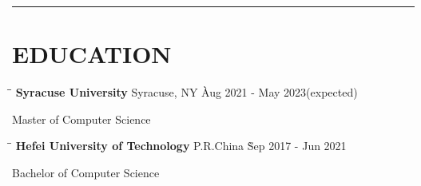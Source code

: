 \documentclass{res}
\begin{document}
 


\address{
    (315)-965-6606 $|$
    Syracuse, NY $|$
    \href{mailto:wangtzuhsiang@gmail.com}{wangtzuhsiang@gmail.com} $|$ 
    \href{https://www.linkedin.com/in/zixiangwang/}{LinkedIn} $|$ 
    \href{https://github.com/DolorHunter}{GitHub} $|$ 
    \href{https://dolorhunter.com}{dolorhunter.com}
}

\begin{resume}

\vspace{-12pt}
\noindent\rule[0.25\baselineskip]{\textwidth}{1pt}    
\vspace{-20pt}  

\vspace{-0.1in}
\section{EDUCATION} 
    \vspace{-0.1in}	 
    \begin{tabbing}
    \hspace{3in}\= \hspace{2in}\= \kill %
    {\bf Syracuse University} \>Syracuse, NY \` Aug 2021 - May 2023(expected)
    \end{tabbing}\vspace{-20pt}      %
    Master of Computer Science      

    \vspace{-0.2in}	 
    \begin{tabbing}
    \hspace{3in}\= \hspace{2in}\= \kill %
    {\bf Hefei University of Technology} \>P.R.China \` Sep 2017 - Jun 2021
    \end{tabbing}\vspace{-20pt}      %
    Bachelor of Computer Science   

\vspace{-0.12in}

\end{resume}
\end{document}
